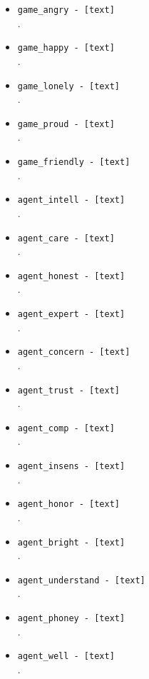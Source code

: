 \begin{description}
\begin{addmargin}[0em]{0em}
\begin{addmargin}[1em]{0em}
\begin{itemize}
            \item \verb|game_angry - [text]|\\.
            \item \verb|game_happy - [text]|\\.
            \item \verb|game_lonely - [text]|\\.
            \item \verb|game_proud - [text]|\\.
            \item \verb|game_friendly - [text]|\\.
            \item \verb|agent_intell - [text]|\\.
            \item \verb|agent_care - [text]|\\.
            \item \verb|agent_honest - [text]|\\.
            \item \verb|agent_expert - [text]|\\.
            \item \verb|agent_concern - [text]|\\.
            \item \verb|agent_trust - [text]|\\.
            \item \verb|agent_comp - [text]|\\.
            \item \verb|agent_insens - [text]|\\.
            \item \verb|agent_honor - [text]|\\.
            \item \verb|agent_bright - [text]|\\.
            \item \verb|agent_understand - [text]|\\.
            \item \verb|agent_phoney - [text]|\\.
            \item \verb|agent_well - [text]|\\.

\end{itemize}
\end{addmargin}
\end{addmargin}
\end{description}
